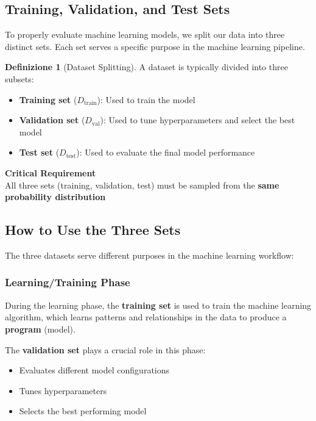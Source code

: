 \documentclass[11pt,a4paper]{article}
\theoremstyle{definition}
\newtheorem{definition}{Definizione}[section]
\theoremstyle{plain}
\theoremstyle{remark}
\begin{document}
\subsection{Training, Validation, and Test Sets}

To properly evaluate machine learning models, we split our data into three distinct sets. Each set serves a specific purpose in the machine learning pipeline.

\begin{definition}[Dataset Splitting]
A dataset is typically divided into three subsets:
\begin{itemize}
    \item \textbf{Training set} ($D_{\text{train}}$): Used to train the model
    \item \textbf{Validation set} ($D_{\text{val}}$): Used to tune hyperparameters and select the best model
    \item \textbf{Test set} ($D_{\text{test}}$): Used to evaluate the final model performance
\end{itemize}
\end{definition}

\begin{center}
\colorbox{yellow!20}{\parbox{0.9\textwidth}{
\centering
\textbf{Critical Requirement}\\[0.2cm]
All three sets (training, validation, test) must be sampled from the \textbf{same probability distribution}
}}
\end{center}

\subsection{How to Use the Three Sets}

The three datasets serve different purposes in the machine learning workflow:

\subsubsection{Learning/Training Phase}

During the learning phase, the \textbf{training set} is used to train the machine learning algorithm, which learns patterns and relationships in the data to produce a \textbf{program} (model). 

The \textbf{validation set} plays a crucial role in this phase:
\begin{itemize}
    \item Evaluates different model configurations
    \item Tunes hyperparameters
    \item Selects the best performing model
\end{itemize}
\end{document}
